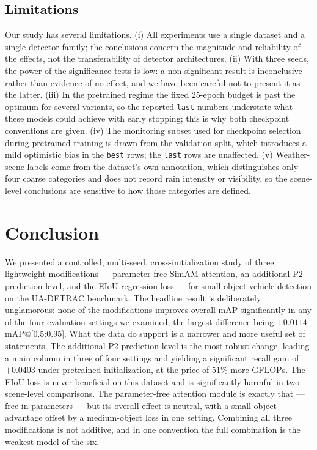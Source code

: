 \documentclass[pdflatex,sn-basic,Numbered]{sn-jnl}%
\begin{document}
\subsection{Limitations}

Our study has several limitations. (i) All experiments use a single dataset and a single detector family; the conclusions concern the magnitude and reliability of the effects, not the transferability of detector architectures. (ii) With three seeds, the power of the significance tests is low: a non-significant result is inconclusive rather than evidence of no effect, and we have been careful not to present it as the latter. (iii) In the pretrained regime the fixed 25-epoch budget is past the optimum for several variants, so the reported \texttt{last} numbers understate what these models could achieve with early stopping; this is why both checkpoint conventions are given. (iv) The monitoring subset used for checkpoint selection during pretrained training is drawn from the validation split, which introduces a mild optimistic bias in the \texttt{best} rows; the \texttt{last} rows are unaffected. (v) Weather-scene labels come from the dataset's own annotation, which distinguishes only four coarse categories and does not record rain intensity or visibility, so the scene-level conclusions are sensitive to how those categories are defined.

\section{Conclusion}\label{sec:conclusion}

We presented a controlled, multi-seed, cross-initialization study of three lightweight modifications --- parameter-free SimAM attention, an additional P2 prediction level, and the EIoU regression loss --- for small-object vehicle detection on the UA-DETRAC benchmark. The headline result is deliberately unglamorous: none of the modifications improves overall mAP significantly in any of the four evaluation settings we examined, the largest difference being $+0.0114$ mAP@[0.5:0.95]. What the data do support is a narrower and more useful set of statements. The additional P2 prediction level is the most robust change, leading a main column in three of four settings and yielding a significant recall gain of $+0.0403$ under pretrained initialization, at the price of $51\%$ more GFLOPs. The EIoU loss is never beneficial on this dataset and is significantly harmful in two scene-level comparisons. The parameter-free attention module is exactly that --- free in parameters --- but its overall effect is neutral, with a small-object advantage offset by a medium-object loss in one setting. Combining all three modifications is not additive, and in one convention the full combination is the weakest model of the six.
\end{document}
